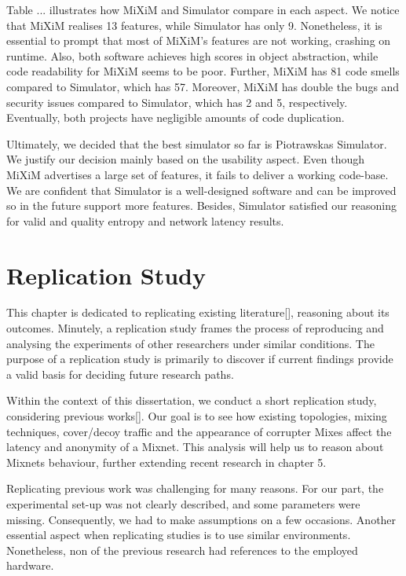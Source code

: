 \documentclass[logo,msc,cyber]{infthesis}   %
\begin{document}
Table ... illustrates how MiXiM and Simulator compare in each aspect. We
notice that MiXiM realises 13 features, while Simulator has only 9.
Nonetheless, it is essential to prompt that most of MiXiM's features are not
working, crashing on runtime. Also, both software achieves high scores in
object abstraction, while code readability for MiXiM seems to be poor.
Further, MiXiM has 81 code smells compared to Simulator, which has 57.
Moreover, MiXiM has double the bugs and security issues compared to
Simulator, which has 2 and 5, respectively. Eventually, both projects have
negligible amounts of code duplication.

Ultimately, we decided that the best simulator so far is Piotrawskas
Simulator. We justify our decision mainly based on the usability aspect.
Even though MiXiM advertises a large set of features, it fails to deliver a
working code-base. We are confident that Simulator is a well-designed
software and can be improved so in the future support more features.
Besides, Simulator satisfied our reasoning for valid and quality entropy and
network latency results. 

\chapter{Replication Study}
This chapter is dedicated to replicating existing literature[], reasoning about
its outcomes. Minutely, a replication study frames the process of reproducing
and analysing the experiments of other researchers under similar conditions. The
purpose of a replication study is primarily to discover if current findings
provide a valid basis for deciding future research paths.

Within the context of this dissertation, we conduct a short replication study,
considering previous works[]. Our goal is to see how existing topologies, mixing
techniques, cover/decoy traffic and the appearance of corrupter Mixes affect the
latency and anonymity of a Mixnet. This analysis will help us to reason about
Mixnets behaviour, further extending recent research in chapter 5.

Replicating previous work was challenging for many reasons. For our part, the
experimental set-up was not clearly described, and some parameters were missing.
Consequently, we had to make assumptions on a few occasions. Another essential
aspect when replicating studies is to use similar environments. Nonetheless, non
of the previous research had references to the employed hardware.
\end{document}
